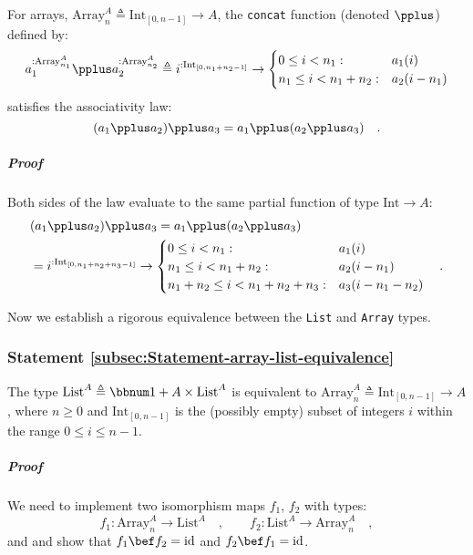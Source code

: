 For arrays, $\text{Array}_{n}^{A}\triangleq\text{Int}_{[0,n-1]}\rightarrow A$,
the \lstinline!concat! function (denoted $\pplus$) defined by:
\[
a_{1}^{:\text{Array}_{n_{1}}^{A}}\pplus a_{2}^{:\text{Array}_{n_{2}}^{A}}\triangleq i^{:\text{Int}_{[0,n_{1}+n_{2}-1]}}\rightarrow\begin{cases}
0\leq i<n_{1}: & a_{1}(i)\\
n_{1}\leq i<n_{1}+n_{2}: & a_{2}(i-n_{1})
\end{cases}
\]
satisfies the associativity law:
\[
(a_{1}\pplus a_{2})\pplus a_{3}=a_{1}\pplus(a_{2}\pplus a_{3})\quad.
\]


\subparagraph{Proof}

Both sides of the law evaluate to the same partial function of type
$\text{Int}\rightarrow A$:
\begin{align*}
 & (a_{1}\pplus a_{2})\pplus a_{3}=a_{1}\pplus(a_{2}\pplus a_{3})\\
 & =i^{:\text{Int}_{[0,n_{1}+n_{2}+n_{3}-1]}}\rightarrow\begin{cases}
0\leq i<n_{1}: & a_{1}(i)\\
n_{1}\leq i<n_{1}+n_{2}: & a_{2}(i-n_{1})\\
n_{1}+n_{2}\leq i<n_{1}+n_{2}+n_{3}: & a_{3}(i-n_{1}-n_{2})
\end{cases}\quad.
\end{align*}

Now we establish a rigorous equivalence between the \lstinline!List!
and \lstinline!Array! types.

\subsubsection{Statement \label{subsec:Statement-array-list-equivalence}\ref{subsec:Statement-array-list-equivalence}}

The type $\text{List}^{A}\triangleq\bbnum 1+A\times\text{List}^{A}$
is equivalent to $\text{Array}_{n}^{A}\triangleq\text{Int}_{[0,n-1]}\rightarrow A$,
where $n\geq0$ and $\text{Int}_{[0,n-1]}$ is the (possibly empty)
subset of integers $i$ within the range $0\leq i\leq n-1$.

\subparagraph{Proof}

We need to implement two isomorphism maps $f_{1}$, $f_{2}$ with
types:
\[
f_{1}:\text{Array}_{n}^{A}\rightarrow\text{List}^{A}\quad,\quad\quad f_{2}:\text{List}^{A}\rightarrow\text{Array}_{n}^{A}\quad,
\]
and and show that $f_{1}\bef f_{2}=\text{id}$ and $f_{2}\bef f_{1}=\text{id}$.

